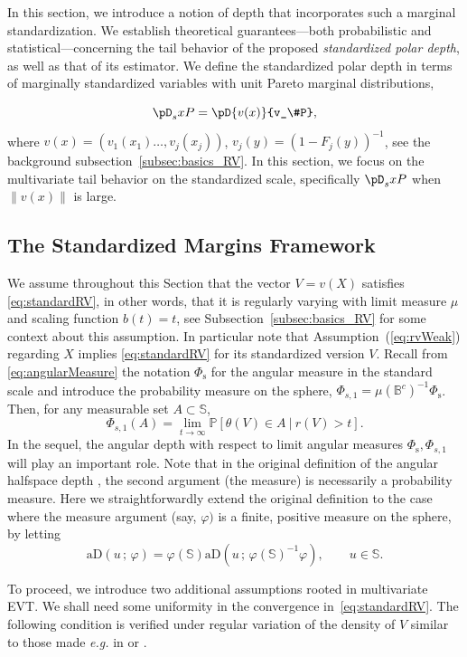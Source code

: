 \documentclass{article}
\numberwithin{equation}{section}
\renewcommand{\P}{\mathbb{P}}
\newcommand{\PP}{\P}%
\newcommand{\sphere}{\mathbb{S}}
\newcommand{\ball}{\mathbb{B}}
\newcommand{\coD}[2]{\pD{#1}{#2}}
\newcommand{\coDs}[2]{\pD_s{#1}{#2}}
\newcommand{\aD}[2]{{\mathrm{aD}}\left({#1}\,;\,{#2}\right)}
\newcommand{\Phitrad}{\Phi_{\mathrm{s}}} %
\newcommand{\Phisprob}{\Phi_{s,1}} %
\begin{document}
In this section, we introduce a notion of depth that incorporates such a marginal standardization. We establish theoretical guarantees—both probabilistic and statistical—concerning the tail behavior of the proposed \emph{standardized polar depth}, as well as that of its estimator. We define the standardized polar depth
in terms of marginally standardized variables with unit Pareto
marginal distributions,

\begin{equation}
    \label{eq:def_polardepth_standardized}
    \coDs{x}{P} = \coD{v(x)}{v_\#P}    ,
\end{equation}
where $v(x) = (v_1(x_1)\ldots, v_j(x_j))$, $v_j(y) = (1 - F_j(y))^{-1}$, see the background subsection~\ref{subsec:basics_RV}.
In this section, we focus on the multivariate tail behavior on the standardized scale, specifically $\coDs{x}{P}$ when $\|v(x)\|$ is large. 


\subsection{The Standardized Margins Framework}
We assume throughout this Section that the vector $V=v(X)$ satisfies \eqref{eq:standardRV}, in other words, that it is regularly varying with limit measure $\mu$ and scaling function $b(t) = t$, see Subsection~\ref{subsec:basics_RV} for some context about this assumption. In particular note that Assumption~(\ref{eq:rvWeak}) regarding $X$ implies \eqref{eq:standardRV} for its standardized version $V$. Recall from \eqref{eq:angularMeasure} the notation $\Phitrad$ for the angular measure in the standard scale and introduce the probability measure on the sphere, $\Phisprob = \mu(\ball^c)^{-1}\Phitrad$. Then, for any measurable set $A\subset\sphere$,
$$\Phisprob(A) = \lim_{t\to\infty} \PP[\theta(V)\in A~|~r(V)>t].$$
In the sequel, the angular depth with respect to limit angular measures $\Phitrad,\Phisprob$ will play an important role. Note that in the original definition of the  angular halfspace depth \citep{NagyDemniButtarazziPorzio2023,nagy2024theoretical}, the second argument (the measure) is necessarily a probability measure. Here we straightforwardly extend the original definition to the case where the measure argument (say, $\varphi) $ is a finite, positive measure on the sphere,  by letting 
$$
\aD{u}{\varphi} = \varphi(\sphere)\aD{u}{ \varphi(\sphere)^{-1}\varphi}, \qquad u\in\sphere.
$$



To proceed, we introduce two additional assumptions rooted in multivariate EVT. 
We shall need some uniformity in the convergence in~\eqref{eq:standardRV}. The following condition  is verified
under regular variation of the density of $V$ similar to those
made \emph{e.g.} in \cite{cai2011estimation} or \cite{clemenccon2025regression}.
\end{document}
